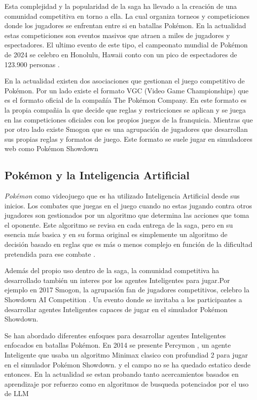 Esta complejidad y la popularidad de la saga ha llevado a la creación de una comunidad competitiva en torno a ella. La cual organiza torneos y competiciones donde los jugadores se enfrentan entre si en batallas Pokémon. En la actualidad estas competiciones son eventos masivos que atraen a miles de jugadores y espectadores. El ultimo evento de este tipo, el campeonato mundial de Pokémon de 2024 se celebro en Honolulu, Hawaii conto con un pico de espectadores de 123.900 personas \cite{2024PokemonWorldChampionshipsViewership}.

En la actualidad existen dos asociaciones que gestionan el juego competitivo de Pokémon. Por un lado existe el formato VGC (Video Game Championships) que es el formato oficial de la compañía The Pokémon Company. En este formato es la propia compañia la que decide que reglas y restricciones se aplican y se juega en las competiciones oficiales con los propios juegos de la franquicia. Mientras que por otro lado existe Smogon que es una agrupación de jugadores que desarrollan sus propias reglas y formatos de juego. Este formato se suele jugar en simuladores web como Pokémon Showdown

\subsection{Pokémon y la Inteligencia Artificial}

\textit{Pokémon} como videojuego que es ha utilizado Inteligencia Artificial desde sus inicios. Los combates que juegas en el juego cuando no estas jugando contra otros jugadores son gestionados por un algoritmo que determina las acciones que toma el oponente. Este algoritmo se revisa en cada entrega de la saga, pero en su esencia más basica y en su forma original es simplemente un algoritmo de decisión basado en reglas que es más o menos complejo en función de la dificultad pretendida para ese combate \cite{PokemonRedAIAlgorithm}.

Además del propio uso dentro de la saga, la comunidad competitiva ha desarrollado también un interes por los agentes Inteligentes para jugar.Por ejemplo en 2017 Smogon, la agrupación fan de jugadores competitivos, celebro la Showdown AI Competition \cite{ShowdownAICompetition}. Un evento donde se invitaba a los participantes a desarrollar agentes Inteligentes capaces de jugar en el simulador Pokémon Showdown. 

Se han abordado diferentes enfoques para desarrollar agentes Inteligentes enfocados en batallas Pokémon. En 2014 se presente Percymon \cite{Percymon}, un agente Inteligente que usaba un algoritmo Minimax clasico con profundiad 2 para jugar en el simulador Pokémon Showdown. y el campo no se ha quedado estatico desde entonces. En la actualidad se estan probando tanto acercamientos basados en aprendizaje por refuerzo \cite{VGCDeepReinforcementLearning} como en algoritmos de busqueda potenciados por el uso de LLM \cite{Pokechamp}

